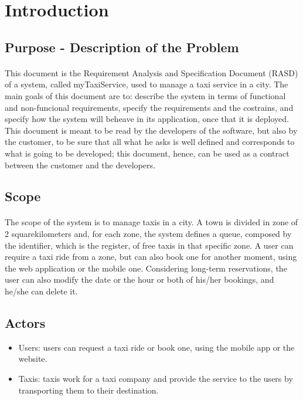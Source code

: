 \section{Introduction}
	\subsection{Purpose - Description of the Problem}
	\paragraph*{}This document is the Requirement Analysis and Specification Document (RASD) of a system, called myTaxiService, used to manage a taxi service in a city. The main goals of this document are to: describe the system in terms of functional and non-funcional requirements, specify the requirements and the costrains, and specify how the system will beheave in its application, once that it is deployed. This document is meant to be read by the developers of the software, but also by the customer, to be sure that all what he asks is well defined and corresponds to what is going to be developed; this document, hence, can be used as a contract between the customer and the developers.
		
	\subsection{Scope}
	\paragraph*{}The scope of the system is to manage taxis in a city. A town is divided in zone of 2 squarekilometers and, for each zone, the system defines a queue, composed by the identifier, which is the register, of free taxis in that specific zone. A user can require a taxi ride from a zone, but can also book one for another moment, using the web application or the mobile one. Considering long-term reservations, the user can also modify the date or the hour or both of his/her bookings, and he/she can delete it. 
	
	\subsection{Actors}
	\begin{itemize}
		\item Users: users can request a taxi ride or book one, using the mobile app or the website.
		\item Taxis: taxis work for a taxi company and provide the service to the users by transporting them to their destination.
	\end{itemize}
	
